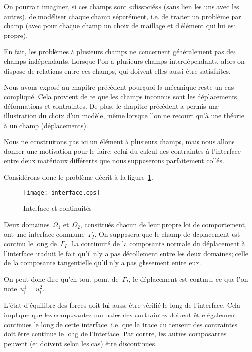 On pourrait imaginer, si ces champs sont «dissociés» (sans lien les uns avec les
autres), de modéliser chaque champ séparément, i.e. de traiter un
problème par champ (avec pour chaque champ un choix de maillage et
d'élément qui lui est propre).

En fait, les problèmes à plusieurs champs ne concernent généralement
pas des champs indépendants.
Lorsque l'on a plusieurs champs interdépendants, alors on dispose de relations
entre ces champs, qui doivent elles-aussi être satisfaites.

\medskip
Nous avons exposé au chapitre précédent pourquoi la mécanique reste un cas
compliqué. Cela provient de ce que les champs inconnus sont les déplacements,
déformations et contraintes.
De plus, le chapitre précédent a permis une illustration du choix d'un modèle,
même lorsque l'on ne recourt qu'à une théorie à un champ (déplacements).

\medskip
Nous ne construirons pas ici un élément à plusieurs champs, mais nous
allons donner une motivation pour le faire: celui du calcul des contraintes à
l'interface entre deux matériaux différents que nous supposerons parfaitement
collés.

Considérons donc le problème décrit à la figure~\ref{interf}.
\begin{figure}[ht]
\centering
\texttt{[image: interface.eps]}
\caption{Interface et continuités}\label{interf}
\end{figure}
Deux domaines~$\Omega_1$ et~$\Omega_2$, consittués chacun de leur
propre loi de comportement, ont une interface commune~$\Gamma_I$.
On supposera que le champ de déplacement est continu le long de~$\Gamma_I$.
La continuité de la composante normale du déplacement à l'interface traduit le
fait qu'il n'y a pas décollement entre les deux domaines; celle de la composante
tangentielle qu'il n'y a pas glissement entre eux.

On peut donc dire qu'en tout point de~$\Gamma_I$, le déplacement est
continu, ce que l'on note~$u_i^1=u_i^2$.

\medskip
L'état d'équilibre des forces doit lui-aussi être vérifié le long de l'interface.
Cela implique que les composantes normales des contraintes doivent être également
continues le long de cette interface, i.e. que la trace du tenseur des contraintes doit
être continue le long de l'interface.
Par contre, les autres composantes peuvent (et doivent selon les cas) être
discontinues.

